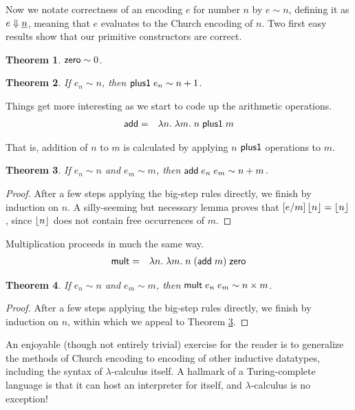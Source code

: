 \documentclass{amsbook}
\newtheorem{theorem}{Theorem}[chapter]
\theoremstyle{definition}
\theoremstyle{remark}
\numberwithin{section}{chapter}
\numberwithin{equation}{chapter}
\begin{document}
Now we notate correctness of an encoding $e$ for number $n$ by $e \sim n$, defining it as $\bigstep{e}{\church{n}}$, meaning that $e$ evaluates to the Church encoding of $n$.
Two first easy results show that our primitive constructors are correct.

\begin{theorem}
  $\lc{zero} \sim 0$.
\end{theorem}

\begin{theorem}
  If $e_n \sim n$, then $\lc{plus1} \; e_n \sim n+1$.
\end{theorem}

Things get more interesting as we start to code up the arithmetic operations.
\begin{eqnarray*}
  \lc{add} &=& \lambda n. \; \lambda m. \; n \; \lc{plus1} \; m
\end{eqnarray*}

That is, addition of $n$ to $m$ is calculated by applying $n$ $\lc{plus1}$ operations to $m$.

\begin{theorem}\label{church_add}
  If $e_n \sim n$ and $e_m \sim m$, then $\lc{add} \; e_n \; e_m \sim n + m$.
\end{theorem}
\begin{proof}
  After a few steps applying the big-step rules directly, we finish by induction on $n$.
  A silly-seeming but necessary lemma proves that $\subst{\prechurch{n}}{m}{e} = \prechurch{n}$, since $\prechurch{n}$ does not contain free occurrences of $m$.
\end{proof}

Multiplication proceeds in much the same way.
\begin{eqnarray*}
  \lc{mult} &=& \lambda n. \; \lambda m. \; n \; (\lc{add} \; m) \; \lc{zero}
\end{eqnarray*}

\begin{theorem}
  If $e_n \sim n$ and $e_m \sim m$, then $\lc{mult} \; e_n \; e_m \sim n \times m$.
\end{theorem}
\begin{proof}
  After a few steps applying the big-step rules directly, we finish by induction on $n$, within which we appeal to Theorem \ref{church_add}.
\end{proof}

An enjoyable (though not entirely trivial) exercise for the reader is to generalize the methods of Church encoding to encoding of other inductive datatypes, including the syntax of $\lambda$-calculus itself.
A hallmark of a Turing-complete language is that it can host an interpreter for itself, and $\lambda$-calculus is no exception!
\end{document}
